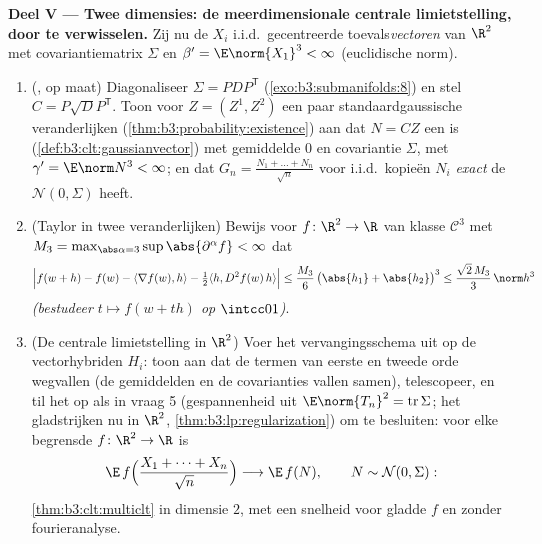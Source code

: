 \begin{problem}
\medskip
\noindent\textbf{Deel V --- Twee dimensies: de meerdimensionale
centrale limietstelling, door te verwisselen.} Zij nu de $X_i$
i.i.d.\ gecentreerde toevals\emph{vectoren} van $\R^2$ met
covariantiematrix $\Sigma$ en $\beta' = \E\norm{X_1}^3 < \infty$
(euclidische norm).
\begin{enumerate}[resume]
  \item (, op maat) Diagonaliseer $\Sigma =
        PDP^{\mathsf T}$ (\cref{exo:b3:submanifolds:8}) en stel
        $C = P\sqrt DP^{\mathsf T}$. Toon voor $Z = (Z^1, Z^2)$
        een paar  standaardgaussische
        veranderlijken (\cref{thm:b3:probability:existence}) aan
        dat $N = CZ$ een  is
        (\cref{def:b3:clt:gaussianvector}) met gemiddelde $0$ en
        covariantie $\Sigma$, met $\gamma' = \E\norm N^3 <
        \infty$; en dat $G_n = \frac{N_1 + \dots + N_n}{\sqrt n}$
        voor i.i.d.\ kopieën $N_i$ \emph{exact} de 
        $\mathcal N(0, \Sigma)$ heeft.
  \item (Taylor in twee veranderlijken) Bewijs voor $f \colon
        \R^2 \to \R$ van klasse $\mathcal C^3$ met $M_3 =
        \max_{\abs\alpha = 3}\sup\abs{\partial^\alpha f} <
        \infty$ dat
        \[
        \Bigl|f(w + h) - f(w) - \langle\nabla f(w),
        h\rangle - \tfrac12\langle h, D^2f(w)\,h\rangle
        \Bigr| \leq \frac{M_3}6\,\bigl(\abs{h_1} +
        \abs{h_2}\bigr)^3 \leq \frac{\sqrt2\,M_3}3\,
        \norm h^3
        \]
        \emph{(bestudeer $t \mapsto f(w + th)$ op $\intcc01$)}.
  \item (De centrale limietstelling in $\R^2$) Voer het
        vervangingsschema uit op de vectorhybriden $H_i$: toon
        aan dat de termen van eerste en tweede orde wegvallen (de
        gemiddelden en de covarianties vallen samen),
        telescopeer, en til het op als in vraag 5 (gespannenheid
        uit $\E\norm{T_n}^2 = \operatorname{tr}\Sigma$; het
        gladstrijken nu in $\R^2$,
        \cref{thm:b3:lp:regularization}) om te besluiten: voor
        elke begrensde  $f \colon \R^2 \to \R$ is
        \[
        \E\,f\Bigl(\frac{X_1 + \dots + X_n}{\sqrt n}\Bigr)
        \longrightarrow \E\,f(N), \qquad N \sim \mathcal
        N(0, \Sigma) :
        \]
        \cref{thm:b3:clt:multiclt} in dimensie $2$, met een
        snelheid voor gladde $f$ en zonder fourieranalyse.

\end{enumerate}
\end{problem}
